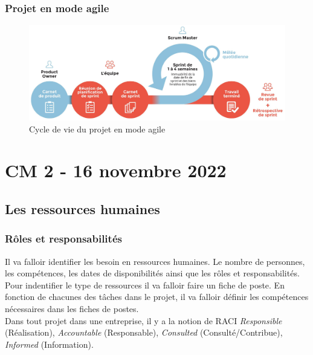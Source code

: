 \documentclass[12pt, a4paper]{article}
\begin{document}
\subsubsection{Projet en mode agile}


\begin{figure}[h]
    \centering
    \includegraphics[width=1\textwidth]{img/capture1.jpeg}
    \caption{Cycle de vie du projet en mode agile}
    \label{fig:cycle}
\end{figure}

\newpage

\section{CM 2 - 16 novembre 2022}
\subsection{Les ressources humaines}
	\subsubsection{Rôles et responsabilités}
	Il va falloir identifier les besoin en ressources humaines. Le nombre de personnes, 
	les compétences, les dates de disponibilités ainsi que les rôles et responsabilités. 
	Pour indentifier le type de ressources il va falloir faire un fiche de poste. 
	En fonction de chacunes des tâches dans le projet, il va falloir définir les
	compétences nécessaires dans les fiches de postes.\\
	Dans tout projet dans une entreprise, il y a la notion de RACI \textit{Responsible} (Réalisation), 
	\textit{Accountable} (Responsable), \textit{Consulted} (Consulté/Contribue), \textit{Informed} (Information).\\


	
\end{document}
